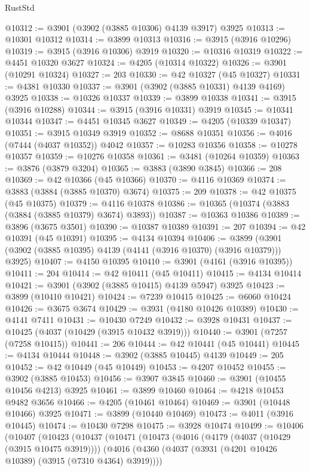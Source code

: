 \begin{lexlean}{RustStd}
\begin{coremodule}
@10312 := @3901 (@3902 (@3885 @10306) @4139 @3917) @3925
@10313 := @10301 @10312
@10314 := @3899 @10313
@10316 := @3915 (@3916 @10296)
@10319 := @3915 (@3916 @10306) @3919
@10320 := @10316 @10319
@10322 := @4451 @10320 @3627
@10324 := @4205 (@10314 @10322)
@10326 := @3901 (@10291 @10324)
@10327 := 203
@10330 := @42 @10327 (@45 @10327)
@10331 := @4381 @10330
@10337 := @3901 (@3902 (@3885 @10331) @4139 @4169) @3925
@10338 := @10326 @10337
@10339 := @3899 @10338
@10341 := @3915 (@3916 @10288)
@10344 := @3915 (@3916 @10331) @3919
@10345 := @10341 @10344
@10347 := @4451 @10345 @3627
@10349 := @4205 (@10339 @10347)
@10351 := @3915 @10349 @3919
@10352 := @8688 @10351
@10356 := @4016 (@7444 (@4037 @10352)) @4042
@10357 := @10283 @10356
@10358 := @10278 @10357
@10359 := @10276 @10358
@10361 := @3481 (@10264 @10359)
@10363 := @3876 (@3879 @3204)
@10365 := @3883 (@3890 @3845)
@10366 := 208
@10369 := @42 @10366 (@45 @10366)
@10370 := @4116 @10369
@10374 := @3883 (@3884 (@3885 @10370) @3674)
@10375 := 209
@10378 := @42 @10375 (@45 @10375)
@10379 := @4116 @10378
@10386 := @10365 (@10374 (@3883 (@3884 (@3885 @10379) @3674) @3893))
@10387 := @10363 @10386
@10389 := @3896 (@3675 @3501)
@10390 := @10387 @10389
@10391 := 207
@10394 := @42 @10391 (@45 @10391)
@10395 := @4134 @10394
@10406 := @3899 (@3901 (@3902 (@3885 @10395) @4139 (@4141 (@3916 @10370) (@3916 @10379))) @3925)
@10407 := @4150 @10395
@10410 := @3901 (@4161 (@3916 @10395))
@10411 := 204
@10414 := @42 @10411 (@45 @10411)
@10415 := @4134 @10414
@10421 := @3901 (@3902 (@3885 @10415) @4139 @5947) @3925
@10423 := @3899 (@10410 @10421)
@10424 := @7239 @10415
@10425 := @6060 @10424
@10426 := @3675 @3674
@10429 := @3931 (@4180 @10426 @10389)
@10430 := @4141 @7411
@10431 := @10430 @7249
@10432 := @3928 @10431
@10437 := @10425 (@4037 (@10429 (@3915 @10432 @3919)))
@10440 := @3901 (@7257 (@7258 @10415))
@10441 := 206
@10444 := @42 @10441 (@45 @10441)
@10445 := @4134 @10444
@10448 := @3902 (@3885 @10445) @4139
@10449 := 205
@10452 := @42 @10449 (@45 @10449)
@10453 := @4207 @10452
@10455 := @3902 (@3885 @10453)
@10456 := @3907 @3845
@10460 := @3901 (@10455 @10456 @4213) @3925
@10461 := @3899 @10460
@10464 := @4218 @10453 @9482 @3656
@10466 := @4205 (@10461 @10464)
@10469 := @3901 (@10448 @10466) @3925
@10471 := @3899 (@10440 @10469)
@10473 := @4011 (@3916 @10445)
@10474 := @10430 @7298
@10475 := @3928 @10474
@10499 := @10406
    (@10407
      (@10423
        (@10437
          (@10471
            (@10473
              (@4016
                (@4179 (@4037 (@10429 (@3915 @10475 @3919))))
                (@4016
                  (@4360 (@4037 (@3931 (@4201 @10426 @10389) (@3915 (@7310 @4364) @3919))))

\end{coremodule}
\end{lexlean}

